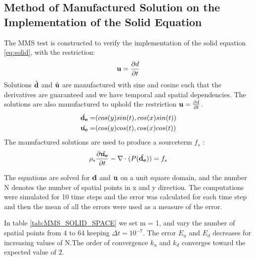 \subsection{Method of Manufactured Solution on the Implementation of the Solid Equation}
The MMS test is constructed to verify the implementation of the solid equation \eqref{eq:solid}, with the restriction:
\begin{equation}
\bold{u}=\frac{\partial d}{\partial t}
\end{equation}
Solutions $\hat{\bold{d}}$ and $\hat{\bold{u}}$ are manufactured with sine and cosine such that the derivatives are guaranteed and we have temporal and spatial dependencies.
The solutions are also manufactured to uphold the restriction $\bold{u}=\frac{\partial d}{\partial t}$.
\begin{align*}
\hat{\bold{d_e}} =& ( cos(y)sin(t) , cos(x)sin(t) )\\
\hat{\bold{u_e}} =& ( cos(y)cos(t), cos(x)cos(t) )
\end{align*}
The manufactured solutions are used to produce a sourceterm $f_s$ :
\begin{equation}
\rho_s \frac{\partial \hat{\bold{u_e}}}{\partial t} - \nabla \cdot ( P(\hat{\bold{d_e}}) ) = f_s 
\end{equation}

The equations are solved for $\bold{d}$ and $\bold{u}$ on a unit square domain, and the number N denotes the number of spatial points in x and y direction.
The computations were simulated for 10 time steps and the error was calculated for each time step and then the mean of all the errors were used as a measure of the error.

In table \ref{tab:MMS_SOLID_SPACE} we set m = 1, and vary the number of spatial points from 4 to 64 keeping $\Delta t = 10^{-7}$. The error $E_u$ and $E_d$ decreases for increasing values of N.The order of convergence $k_u$ and $k_d$ converges toward the expected value of 2.

